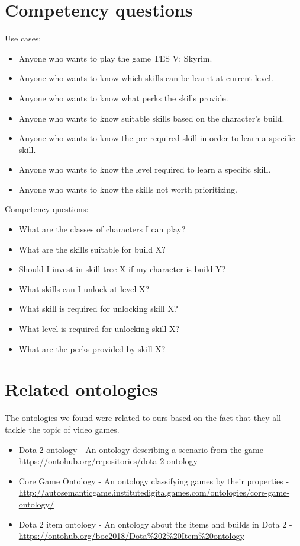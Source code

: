 \documentclass[a4paper,12pt]{report}
\begin{document}
\section{Competency questions}
Use cases:
\begin{itemize}
 \item Anyone who wants to play the game TES V: Skyrim.
 \item Anyone who wants to know which skills can be learnt at current level.
 \item Anyone who wants to know what perks the skills provide.
 \item Anyone who wants to know suitable skills based on the character's build.
 \item Anyone who wants to know the pre-required skill in order to learn a specific skill.
 \item Anyone who wants to know the level required to learn a specific skill.
 \item Anyone who wants to know the skills not worth prioritizing.
\end{itemize}
\hfill \break
Competency questions:
\begin{itemize}
  \item What are the classes of characters I can play?
  \item What are the skills suitable for build X?
  \item Should I invest in skill tree X if my character is build Y?
  \item What skills can I unlock at level X?
  \item What skill is required for unlocking skill X?
  \item What level is required for unlocking skill X?
  \item What are the perks provided by skill X?
\end{itemize}


\clearpage
\section{Related ontologies}
The ontologies we found were related to ours based on the fact that they all tackle the topic of video games.
\begin{itemize}
    \item Dota 2 ontology - An ontology describing a scenario from the game - \url{https://ontohub.org/repositories/dota-2-ontology}
    \item Core Game Ontology - An ontology classifying games by their properties - \url{http://autosemanticgame.institutedigitalgames.com/ontologies/core-game-ontology/}
    \item Dota 2 item ontology - An ontology about the items and builds in Dota 2 - \url{https://ontohub.org/boc2018/Dota\%202\%20Item\%20ontology}
\end{itemize}
\end{document}
